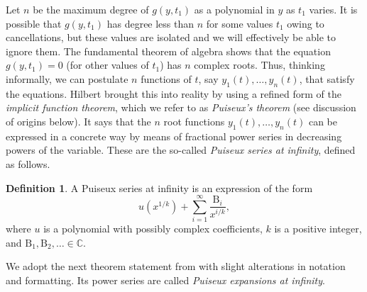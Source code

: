 \documentclass{article}
\theoremstyle{plain}
\theoremstyle{definition}
\newtheorem{definition}{Definition}
\newcommand{\Cee}{\mathbb{C}}   %
\newcommand{\Nat}{\mathbb{N}}   %
\begin{document}
Let $n$ be the maximum degree of $g(y,t_1)$ as a polynomial in $y$ as $t_1$ varies.  It is possible that $g(y,t_1)$ has degree less than $n$ for some values $t_1$ owing to cancellations, but these values are isolated and we will effectively be able to ignore them.  
The fundamental theorem of algebra shows that the equation $g(y,t_1) = 0$ (for other values of $t_1$) has $n$ complex roots.
Thus, thinking informally, we can postulate $n$ functions of $t$, say $y_1(t),\dots,y_n(t)$,
that satisfy the equations. Hilbert brought this into reality by using a refined form of the
\emph{implicit function theorem}, which we refer to as \emph{Puiseux's
theorem} (see discussion of origins below). It says that the $n$ root
functions $y_1(t),\dots,y_n(t)$ can be expressed in a concrete way by
means of fractional power series in decreasing powers of the variable.
These are the so-called \emph{Puiseux series at infinity}, defined as follows.

\begin{definition} %
\label{de:pu}
A Puiseux series at infinity is an expression of the
form
\[
u(x^{1/k}) + \sum_{i=1}^\infty \frac{\mathrm{B}_i}{x^{i/k}},
\]
where $u$ is a polynomial with possibly complex coefficients, $k$ is a positive integer, and
$\mathrm{B}_1,\mathrm{B}_2,\ldots \in \Cee$.
\end{definition}

\noindent
We adopt the next theorem statement from \cite[pp.~80--81]{Tz}
with slight alterations in notation and formatting. Its power series
are called \emph{Puiseux expansions at infinity}.
\end{document}
